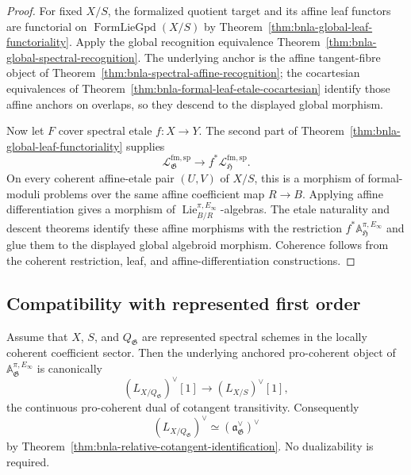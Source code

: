 \begin{proof}
For fixed $X/S$, the formalized quotient target and its affine leaf functors
are functorial on $\operatorname{FormLieGpd}(X/S)$ by
Theorem~\ref{thm:bnla-global-leaf-functoriality}.  Apply the global recognition
equivalence Theorem~\ref{thm:bnla-global-spectral-recognition}.  The underlying
anchor is the affine tangent-fibre object of
Theorem~\ref{thm:bnla-spectral-affine-recognition}; the cocartesian
equivalences of Theorem~\ref{thm:bnla-formal-leaf-etale-cocartesian} identify
those affine anchors on overlaps, so they descend to the displayed global
morphism.

Now let $F$ cover spectral etale $f:X\to Y$.  The second part of
Theorem~\ref{thm:bnla-global-leaf-functoriality} supplies
\[
    \mathcal L^{\mathrm{fm,sp}}_{\mathfrak G}
    \longrightarrow
    f^*\mathcal L^{\mathrm{fm,sp}}_{\mathfrak H}.
\]
On every coherent affine-etale pair $(U,V)$ of $X/S$, this is a morphism of
formal-moduli problems over the same affine coefficient map $R\to B$.
Applying affine differentiation gives a morphism of
$\operatorname{Lie}^{\pi,E_\infty}_{B/R}$-algebras.  The etale naturality and
descent theorems identify these affine morphisms with the restriction
$f^*\mathbb A^{\pi,E_\infty}_{\mathfrak H}$ and glue them to the displayed
global algebroid morphism.  Coherence follows from the coherent restriction,
leaf, and affine-differentiation constructions.
\end{proof}

\subsection{Compatibility with represented first order}

\begin{theorem}
\label{thm:bnla-spectral-represented-first-order-comparison}
Assume that $X$, $S$, and $Q_{\mathfrak G}$ are represented spectral schemes
in the locally coherent coefficient sector.  Then the underlying anchored
pro-coherent object of
$\mathbb A^{\pi,E_\infty}_{\mathfrak G}$ is canonically
\[
\boxed{
    \left(L_{X/Q_{\mathfrak G}}\right)^\vee[1]
    \longrightarrow
    \left(L_{X/S}\right)^\vee[1],}
\]
the continuous pro-coherent dual of cotangent transitivity.  Consequently
\[
    \left(L_{X/Q_{\mathfrak G}}\right)^\vee
    \simeq
    \left(\mathfrak a^\vee_{\mathfrak G}\right)^\vee
\]
by Theorem~\ref{thm:bnla-relative-cotangent-identification}.  No dualizability
is required.
\end{theorem}


